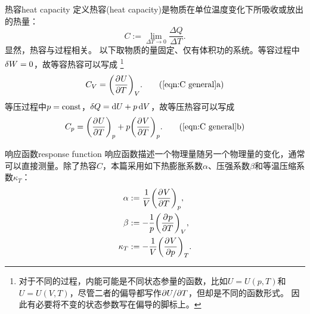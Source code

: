 
\begin{definition}{热容}{heat capacity}
	定义热容(heat capacity)是物质在单位温度变化下所吸收或放出的热量：
	\begin{equation}
		\label{eqn:C general}
		C := \lim_{\Delta T\to0}\frac{\Delta Q}{\Delta T}.
	\end{equation}
	显然，热容与过程相关。
	以下取物质的量固定、仅有体积功的系统。等容过程中$\mathop{}\!\delta W = 0$，故等容热容可以写成
	\footnote{对于不同的过程，内能可能是不同状态参量的函数，比如$U = U(p,T)$和$U = U(V,T)$，尽管二者的偏导都写作$\partial U/\partial T$，但却是不同的函数形式。
	因此有必要将不变的状态参数写在偏导的脚标上。}
	\begin{equation}
		\label{eqn:C_V}
		C_V = \pvat{U}{T}{V}.
		\tag{\ref{eqn:C general}a}
	\end{equation}
	等压过程中$p = \mathrm{const}$，$\mathop{}\!\delta Q = \mathop{}\!\mathrm{d} U + p\mathop{}\!\mathrm{d} V$，故等压热容可以写成
	\begin{equation}
		\label{eqn:C_p}
		C_p = \pvat{U}{T}{p} + p\pvat{V}{T}{p}.
		\tag{\ref{eqn:C general}b}
	\end{equation}
\end{definition}

\begin{definition}
	{响应函数}{response function}
	响应函数描述一个物理量随另一个物理量的变化，通常可以直接测量。除了热容$C$，本篇采用如下热膨胀系数$\alpha$、压强系数$\beta$和等温压缩系数$\kappa_T$：
	\begin{subequations}
		\begin{align}
			\alpha &:= \frac1V\biggl(\frac{\partial^{}V}{\partial{T}^{}}\biggr)_{p},\\
			\beta &:= -\frac1p\biggl(\frac{\partial^{}p}{\partial{T}^{}}\biggr)_{V},\\
			\kappa_T &:= -\frac1V\biggl(\frac{\partial^{}V}{\partial{p}^{}}\biggr)_{T}.
		\end{align}
	\end{subequations}
\end{definition}

